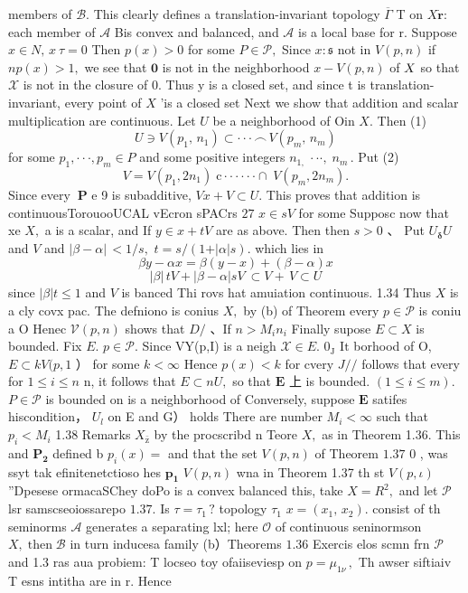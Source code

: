 members of ${\mathcal{B}}.$ This clearly defines a translation-invariant topology $\overline{{\Gamma}}$ T on $X{\dot{\boldsymbol{r}}}:$ each member of ${\mathcal{A}}$ Bis convex and balanced, and ${\mathcal{A}}$ is a local base for r. Suppose $x\in N,\,x\ \tau=0$ Then $p(x)>0$ for some $P\in{\mathcal{P}},$ Since $x:{\mathfrak{s}}$ not in $V(p,n)$ if $n p(x)>1,$ we see that $\mathbf{0}$ is not in the neighborhood $x-V(p,n)$ of $X_{\textstyle}$ so that $\scriptstyle{\mathcal{X}}$ is not in the closure of {0}. Thus {y} is a closed set, and since t is translation-invariant, every point of $\textstyle{X}$ ’is a closed set Next we show that addition and scalar multiplication are continuous. Let $U$ be a neighborhood of Oin $X.$ Then (1) $$ U\ni V(p_{1},\,n_{1})\subset\cdot\cdot\cdot\,\frown\,V(p_{m},\,n_{m}) $$ for some $p_{1},\cdot\cdot\cdot,p_{m}\in P$ and some positive integers $n_{1,}\,\cdot\cdot\cdot,\;n_{m}\,.$ Put (2) $$ V=V(p_{1},2n_{1})\;\mathrm{c}\cdot\cdot\cdot\cdot\cdot\cdot\cap\;V(p_{m},2n_{m}). $$ Since every $~{\boldsymbol{P}}$ e 9 is subadditive, $V x+V\subset U.$ This proves that addition is continuousTorouooUCAL vEcron sPACrs $27$ $x\in s V$ for some Supposc now that xe $X,$ a is a scalar, and If $y\in x+t V$ are as above. Then then $s>0$ 、 Put $U_{\mathbf{\delta}}U$ and ${\mathbf{}}V$ and $\left|\beta-\alpha\right|\,<1/s,$ $t=s/(1+\vert\alpha\vert s).$ which lies in $$ \beta y-\alpha x=\beta(y-x)+(\beta-\alpha)x $$ $$ |\beta|\,t V+|\beta-\alpha|s V\mathrm{\!~}\subset V+\,V\subset U $$ since $|\beta|t\leq1$ and ${\mathbf{}}V$ is banced Thi rovs hat amuiation continuous. 1.34 Thus $\textstyle X$ is a cly covx pac. The defniono is conius $X,$ by (b) of Theorem every $p\in{\mathcal{P}}$ is coniu a O Henec $\mathcal{V}(p,n)$ shows that $D\!\!\!\!/$ 、If $n>M_{i}n_{i}$ Finally supose $E\subset X$ is bounded. Fix $E.$ $p\in{\mathcal{P}}.$ Since VY(p,I) is a neigh ${\mathcal{X}}\in E.$ $0_{\mathrm{{J}}}$ $\mathrm{{It}}$ borhood of O, $E\subset k V(p,1$ ） for some $k<\infty$ Hence $p(x)<k$ for cvery $J/{\big/}$ follows that every for $1\leq i\leq n$ n, it follows that $E\subset n U,$ so that ${\boldsymbol{E}}$ 上 is bounded. $(1\leq i\leq m).$ $P\in{\mathcal{P}}$ is bounded on is a neighborhood of Conversely, suppose ${\boldsymbol{E}}$ satifes hiscondition， $U_{\mathit{l}}$ on E and G） holds There are number $M_{i}<\infty$ such that $p_{i}<M_{i}$ 1.38 Remarks $X_{\mathrm{\bar{z}}}$ by the procscribd n Teore $X,$ as in Theorem 1.36. This and $\boldsymbol{P_{2}}$ defined b $p_{i}(x)=$ and that the set $V(p,n)$ of Theorem $1.37$ 0 , was ssyt tak efinitenetctioso hes ${\boldsymbol{p}}_{\boldsymbol{1}}$ ${\mathit{V}}(p,n)$ wna in Theorem 1.37 th st $\scriptstyle V(p,\iota)$ ”Dpesese ormacaSChey doPo is a convex balanced this, take $X=R^{2},$ and let ${\mathcal{P}}$ lsr samscseoiossarepo $1.37.$ Is $\tau=\tau_{1}\,?$ topology $\tau_{1}$ $x=(x_{1},\,x_{2}).$ consist of th seminorms ${\mathcal{A}}$ generates a separating lxl; here ${\mathcal{O}}$ of continuous seninormson $X,\operatorname{then}{\mathcal{B}}$ in turn inducesa family (b）Theorems $1.36$ Exercis elos scmn frn ${\mathcal{P}}$ and 1.3 ras aua probiem: T locseo toy ofaiiseviesp on $p=\mu_{1\nu}\,,$ Th awser siftiaiv T esns intitha are in r. Hence 